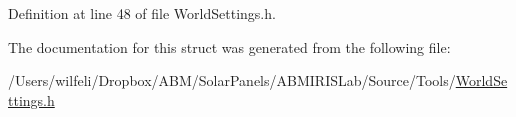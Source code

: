 Definition at line 48 of file World\+Settings.\+h.



The documentation for this struct was generated from the following file\+:\begin{DoxyCompactItemize}
\item 
/\+Users/wilfeli/\+Dropbox/\+A\+B\+M/\+Solar\+Panels/\+A\+B\+M\+I\+R\+I\+S\+Lab/\+Source/\+Tools/\hyperlink{_world_settings_8h}{World\+Settings.\+h}\end{DoxyCompactItemize}
